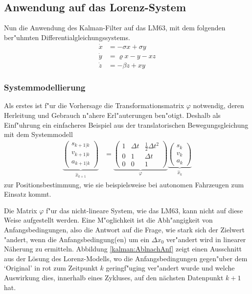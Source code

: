 \begin{refsection}
\subsection{Anwendung auf das Lorenz-System}
Nun die Anwendung des Kalman-Filter auf das LM63, mit dem folgenden ber"uhmten Differentialgleichungssystems.
\begin{equation}
\begin{aligned}
\dot x &= -\sigma x + \sigma y\\
\dot y &= \varrho x - y - x z\\
\dot z &= -\beta z + x y
\end{aligned}
\label{kalman:lm63} 
\end{equation}

\subsubsection{Systemmodellierung}
%
Als erstes ist f"ur die Vorhersage die Transformationsmatrix $\varphi$
notwendig, deren Herleitung und Gebrauch n"ahere Erl"auterungen
ben"otigt. Deshalb als Einf"uhrung ein einfacheres Beispiel aus der
translatorischen Bewegungsgleichung mit dem Systemmodell
\begin{align}
\underbrace{\begin{pmatrix}
s_{k+1|k} \\ 
v_{k+1|k} \\ 
a_{k+1|k}
\end{pmatrix}}_{\displaystyle\hat{x}_{k+1}}
&=
\underbrace{\begin{pmatrix}
 1 & \Delta t & \frac{1}{2}\Delta t^{2} \\ 
 0 & 1 & \Delta t \\ 
 0 & 0 & 1
 \end{pmatrix}}_{\displaystyle\varphi}
\underbrace{\begin{pmatrix}
   s_{k} \\ 
   v_{k} \\ 
   a_{k}
   \end{pmatrix}}_{\displaystyle\hat{x}_{k}}
\label{kalman:Posbest}
\end{align}
zur Positionsbestimmung, wie sie beispielsweise bei autonomen Fahrzeugen
zum Einsatz kommt.

Die Matrix $\varphi$ f"ur das nicht-lineare System, wie das LM63, kann
nicht auf diese  Weise aufgestellt werden. Eine M"oglichkeit ist
die Abh"angigkeit von Anfangsbedingungen, also die Antwort auf 
die Frage, wie stark sich der Zielwert "andert, wenn die Anfangsbedingung(en)
um ein $\Delta x_{0}$ ver"andert wird in linearer Näherung zu ermitteln.
Abbildung \ref{kalman:AblnachAnf} zeigt
einen Ausschnitt aus der Lösung des Lorenz-Modells, wo die Anfangsbedingungen
gegen"uber dem `Original' in rot zum Zeitpunkt $k$ geringf"uging
ver"andert wurde und welche Auswirkung dies, innerhalb eines Zykluses,
auf den nächsten Datenpunkt $k+1$ hat.


\end{refsection}
